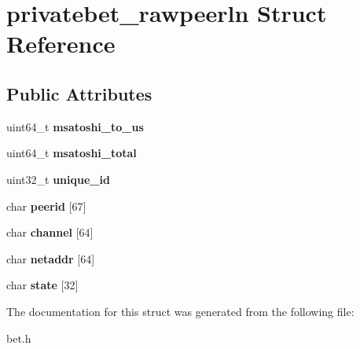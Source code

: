 \hypertarget{structprivatebet__rawpeerln}{}\section{privatebet\+\_\+rawpeerln Struct Reference}
\label{structprivatebet__rawpeerln}
\subsection*{Public Attributes}
\begin{DoxyCompactItemize}
\item 
\mbox{\label{structprivatebet__rawpeerln_af7884913a1c30729415f2adcc5d24ea3}} 
uint64\+\_\+t {\bfseries msatoshi\+\_\+to\+\_\+us}
\item 
\mbox{\label{structprivatebet__rawpeerln_a21761ed0493fefc629ad0c283118edbf}} 
uint64\+\_\+t {\bfseries msatoshi\+\_\+total}
\item 
\mbox{\label{structprivatebet__rawpeerln_aafdd221293a0b3c26dd6648988885c9e}} 
uint32\+\_\+t {\bfseries unique\+\_\+id}
\item 
\mbox{\label{structprivatebet__rawpeerln_a12c96ca3817b6f8a222dd5b8420ebee5}} 
char {\bfseries peerid} \mbox{[}67\mbox{]}
\item 
\mbox{\label{structprivatebet__rawpeerln_ac23c7f3234956f63ad4d0948133784d2}} 
char {\bfseries channel} \mbox{[}64\mbox{]}
\item 
\mbox{\label{structprivatebet__rawpeerln_a8ded3169d57b93d556f08f667ea8db51}} 
char {\bfseries netaddr} \mbox{[}64\mbox{]}
\item 
\mbox{\label{structprivatebet__rawpeerln_a9125d772164f03871992f971d06624eb}} 
char {\bfseries state} \mbox{[}32\mbox{]}
\end{DoxyCompactItemize}


The documentation for this struct was generated from the following file\+:\begin{DoxyCompactItemize}
\item 
bet.\+h\end{DoxyCompactItemize}
